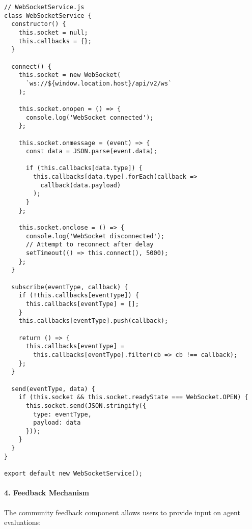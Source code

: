 \documentclass[conference]{IEEEtran}
\begin{document}
\begin{verbatim}
// WebSocketService.js
class WebSocketService {
  constructor() {
    this.socket = null;
    this.callbacks = {};
  }
  
  connect() {
    this.socket = new WebSocket(
      `ws://${window.location.host}/api/v2/ws`
    );
    
    this.socket.onopen = () => {
      console.log('WebSocket connected');
    };
    
    this.socket.onmessage = (event) => {
      const data = JSON.parse(event.data);
      
      if (this.callbacks[data.type]) {
        this.callbacks[data.type].forEach(callback => 
          callback(data.payload)
        );
      }
    };
    
    this.socket.onclose = () => {
      console.log('WebSocket disconnected');
      // Attempt to reconnect after delay
      setTimeout(() => this.connect(), 5000);
    };
  }
  
  subscribe(eventType, callback) {
    if (!this.callbacks[eventType]) {
      this.callbacks[eventType] = [];
    }
    this.callbacks[eventType].push(callback);
    
    return () => {
      this.callbacks[eventType] = 
        this.callbacks[eventType].filter(cb => cb !== callback);
    };
  }
  
  send(eventType, data) {
    if (this.socket && this.socket.readyState === WebSocket.OPEN) {
      this.socket.send(JSON.stringify({
        type: eventType,
        payload: data
      }));
    }
  }
}

export default new WebSocketService();
\end{verbatim}

\paragraph{4. Feedback Mechanism}
The community feedback component allows users to provide input on agent evaluations:
\end{document}
